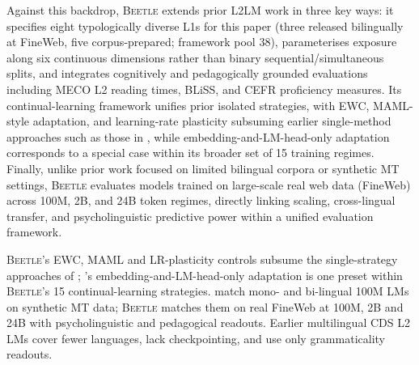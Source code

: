 Against this backdrop, \textsc{Beetle} extends prior L2LM work in three key ways: it specifies eight typologically diverse L1s for this paper (three released bilingually at FineWeb, five corpus-prepared; framework pool 38), parameterises exposure along six continuous dimensions rather than binary sequential/simultaneous splits, and integrates cognitively and pedagogically grounded evaluations including MECO L2 reading times, BLiSS, and CEFR proficiency measures. Its continual-learning framework unifies prior isolated strategies, with EWC, MAML-style adaptation, and learning-rate plasticity subsuming earlier single-method approaches such as those in \citet{constantinescu2025investigating}, while embedding-and-LM-head-only adaptation corresponds to a special case within its broader set of 15 training regimes. Finally, unlike prior work focused on limited bilingual corpora or synthetic MT settings, \textsc{Beetle} evaluates models trained on large-scale real web data (FineWeb) across 100M, 2B, and 24B token regimes, directly linking scaling, cross-lingual transfer, and psycholinguistic predictive power within a unified evaluation framework.


 \textsc{Beetle}'s EWC, MAML and LR-plasticity controls subsume the single-strategy approaches of \citet{constantinescu2025investigating}; \citet{aoyama2024modeling}'s embedding-and-LM-head-only adaptation is one preset within \textsc{Beetle}'s 15 continual-learning strategies. \citet{feng2026bilingual} match mono- and bi-lingual 100M LMs on synthetic MT data; \textsc{Beetle} matches them on real FineWeb at 100M, 2B and 24B with psycholinguistic and pedagogical readouts. Earlier multilingual CDS L2 LMs \citep{yadavalli-etal-2023-slabert, oba-etal-2023-second} cover fewer languages, lack checkpointing, and use only grammaticality readouts.


